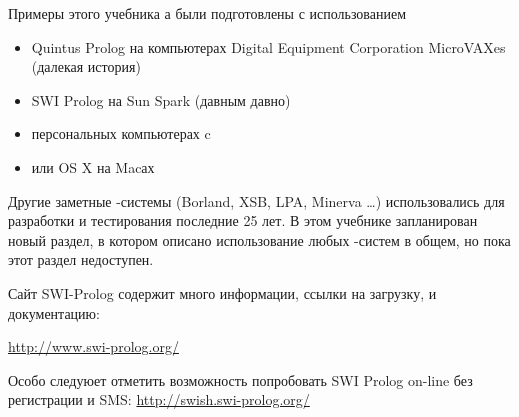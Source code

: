 \label{fish1}

Примеры этого учебника \prolog а были подготовлены с использованием

\begin{itemize}[nosep]
  \item Quintus Prolog на компьютерах Digital Equipment Corporation MicroVAXes
  (далекая история)
  \item SWI Prolog на Sun Spark (давным давно)
  \item персональных компьютерах c \win
  \item или OS X на Macах  
\end{itemize}
 
Другие заметные \prolog-системы (Borland, XSB, LPA, Minerva \ldots)
использовались для разработки и тестирования последние 25 лет.
В этом учебнике запланирован новый раздел, в котором описано использование
любых \prolog-систем в общем, но пока этот раздел недоступен.

Сайт SWI-Prolog содержит много информации, ссылки на загрузку, и документацию:

\url{http://www.swi-prolog.org/}

Особо следуюет отметить возможность попробовать SWI Prolog on-line без 
регистрации и SMS: \url{http://swish.swi-prolog.org/}  
